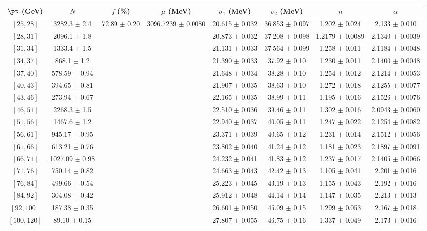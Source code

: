 \begin{tabular}{c||c|c|c|c|c|c|c}
$\pt$ (GeV) & $N$ & $f$ (\%) & $\mu$ (MeV) & $\sigma_1$ (MeV) & $\sigma_2$ (MeV) & $n$ & $\alpha$ \\
\hline
$[25, 28]$ & 3282.3 $\pm$ 2.4 & \multirow{17}{*}{72.89 $\pm$ 0.20} & \multirow{17}{*}{3096.7239 $\pm$ 0.0080} & 20.615 $\pm$ 0.032 & 36.853 $\pm$ 0.097 & 1.202 $\pm$ 0.024 & 2.133 $\pm$ 0.010\\
$[28, 31]$ & 2096.1 $\pm$ 1.8 &  &  & 20.873 $\pm$ 0.032 & 37.208 $\pm$ 0.098 & 1.2179 $\pm$ 0.0089 & 2.1340 $\pm$ 0.0039\\
$[31, 34]$ & 1333.4 $\pm$ 1.5 &  &  & 21.131 $\pm$ 0.033 & 37.564 $\pm$ 0.099 & 1.258 $\pm$ 0.011 & 2.1184 $\pm$ 0.0048\\
$[34, 37]$ & 868.1 $\pm$ 1.2 &  &  & 21.390 $\pm$ 0.033 & 37.92 $\pm$ 0.10 & 1.230 $\pm$ 0.011 & 2.1400 $\pm$ 0.0048\\
$[37, 40]$ & 578.59 $\pm$ 0.94 &  &  & 21.648 $\pm$ 0.034 & 38.28 $\pm$ 0.10 & 1.254 $\pm$ 0.012 & 2.1214 $\pm$ 0.0053\\
$[40, 43]$ & 394.65 $\pm$ 0.81 &  &  & 21.907 $\pm$ 0.035 & 38.63 $\pm$ 0.10 & 1.272 $\pm$ 0.018 & 2.1255 $\pm$ 0.0077\\
$[43, 46]$ & 273.94 $\pm$ 0.67 &  &  & 22.165 $\pm$ 0.035 & 38.99 $\pm$ 0.11 & 1.195 $\pm$ 0.016 & 2.1526 $\pm$ 0.0076\\
$[46, 51]$ & 2268.3 $\pm$ 1.5 &  &  & 22.510 $\pm$ 0.036 & 39.46 $\pm$ 0.11 & 1.302 $\pm$ 0.016 & 2.0943 $\pm$ 0.0060\\
$[51, 56]$ & 1467.6 $\pm$ 1.2 &  &  & 22.940 $\pm$ 0.037 & 40.05 $\pm$ 0.11 & 1.247 $\pm$ 0.022 & 2.1254 $\pm$ 0.0082\\
$[56, 61]$ & 945.17 $\pm$ 0.95 &  &  & 23.371 $\pm$ 0.039 & 40.65 $\pm$ 0.12 & 1.231 $\pm$ 0.014 & 2.1512 $\pm$ 0.0056\\
$[61, 66]$ & 613.21 $\pm$ 0.76 &  &  & 23.802 $\pm$ 0.040 & 41.24 $\pm$ 0.12 & 1.181 $\pm$ 0.023 & 2.1897 $\pm$ 0.0091\\
$[66, 71]$ & 1027.09 $\pm$ 0.98 &  &  & 24.232 $\pm$ 0.041 & 41.83 $\pm$ 0.12 & 1.237 $\pm$ 0.017 & 2.1405 $\pm$ 0.0066\\
$[71, 76]$ & 750.14 $\pm$ 0.82 &  &  & 24.663 $\pm$ 0.043 & 42.42 $\pm$ 0.13 & 1.105 $\pm$ 0.041 & 2.201 $\pm$ 0.016\\
$[76, 84]$ & 499.66 $\pm$ 0.54 &  &  & 25.223 $\pm$ 0.045 & 43.19 $\pm$ 0.13 & 1.155 $\pm$ 0.043 & 2.192 $\pm$ 0.016\\
$[84, 92]$ & 304.08 $\pm$ 0.42 &  &  & 25.912 $\pm$ 0.048 & 44.14 $\pm$ 0.14 & 1.147 $\pm$ 0.035 & 2.213 $\pm$ 0.013\\
$[92, 100]$ & 187.38 $\pm$ 0.35 &  &  & 26.601 $\pm$ 0.050 & 45.09 $\pm$ 0.15 & 1.299 $\pm$ 0.053 & 2.167 $\pm$ 0.018\\
$[100, 120]$ & 89.10 $\pm$ 0.15 &  &  & 27.807 $\pm$ 0.055 & 46.75 $\pm$ 0.16 & 1.337 $\pm$ 0.049 & 2.173 $\pm$ 0.016\\
\end{tabular}
